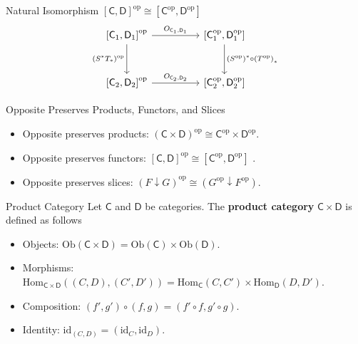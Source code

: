 \begin{proposition}{Natural Isomorphism $\left[\mathsf{C},\mathsf{D}\right]^{\mathrm{op}}\cong \left[\mathsf{C}^{\mathrm{op}},\mathsf{D}^{\mathrm{op}}\right]$}{}
\[\begin{tikzcd}[ampersand replacement=\&, row sep=3em]
            \left[\mathsf{C}_1,\mathsf{D}_1\right]^{\mathrm{op}}\arrow[rr, "O_{\mathsf{C}_1,\mathsf{D}_1}"]\arrow[d, "(S^*T_*)^{\mathrm{op}}"{name=L, left}] 
            \& \&\left[\mathsf{C}_1^{\mathrm{op}},\mathsf{D}_1^{\mathrm{op}}\right]\arrow[d, "\left(S^{\mathrm{op}}\right)^*\circ\left(T^{\mathrm{op}}\right)_*"{name=R}] \\ 
            \left[\mathsf{C}_2,\mathsf{D}_2\right]^{\mathrm{op}}\arrow[rr, "O_{\mathsf{C}_2,\mathsf{D}_2}"]
            \& \&\left[\mathsf{C}_2^{\mathrm{op}},\mathsf{D}_2^{\mathrm{op}}\right]
        \end{tikzcd}
    \]
\end{proposition}


\begin{proposition}{Opposite Preserves Products, Functors, and Slices}{}
    \begin{itemize}
        \item Opposite preserves products:
        $(\mathsf{C} \times \mathsf{D})^{\mathrm{op}} \cong \mathsf{C}^{\mathrm{op}} \times \mathsf{D}^{\mathrm{op}}$.
    \item Opposite preserves functors:
    $[\mathsf{C}, \mathsf{D}]^{\mathrm{op}} \cong [\mathsf{C}^{\mathrm{op}}, \mathsf{D}^{\mathrm{op}}]$ .
    \item Opposite preserves slices:
    $(F \downarrow G)^{\mathrm{op}} \cong\left(G^{\mathrm{op}} \downarrow F^{\mathrm{op}}\right)$.
    \end{itemize}
\end{proposition}

\begin{definition}{Product Category}{}
    Let $\mathsf{C}$ and $\mathsf{D}$ be categories. The \textbf{product category} $\mathsf{C}\times \mathsf{D}$ is defined as follows
    \begin{itemize}
        \item Objects: $\mathrm{Ob}(\mathsf{C}\times \mathsf{D})=\mathrm{Ob}(\mathsf{C})\times \mathrm{Ob}(\mathsf{D})$.
        \item Morphisms: $\mathrm{Hom}_{\mathsf{C}\times \mathsf{D}}((C,D),(C',D'))=\mathrm{Hom}_{\mathsf{C}}(C,C')\times \mathrm{Hom}_{\mathsf{D}}(D,D')$.
        \item Composition: $(f',g')\circ (f,g)=(f'\circ f,g'\circ g)$.
        \item Identity: $\mathrm{id}_{(C,D)}=(\mathrm{id}_C,\mathrm{id}_D)$.
    \end{itemize}
\end{definition}

